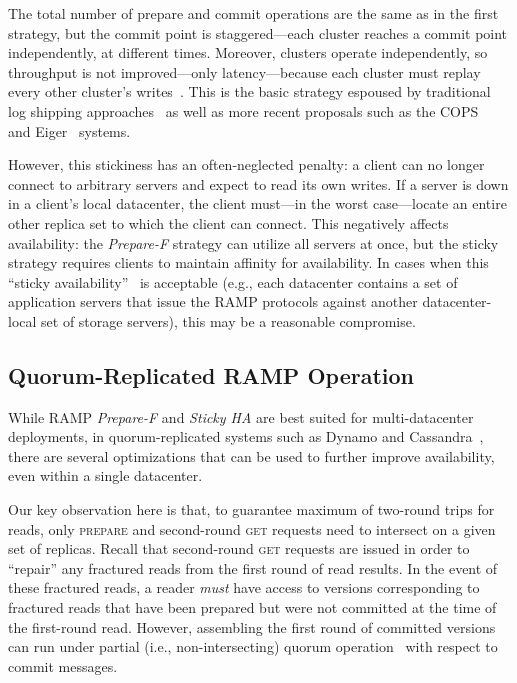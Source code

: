 The total number of prepare and commit operations are the same as in the first strategy, but the commit point is staggered---each cluster reaches a commit point independently, at different times. Moreover, clusters operate independently, so throughput is not improved---only latency---because each cluster must replay every other cluster's writes~\cite{explicit-socc}. This is the basic strategy espoused by traditional log shipping approaches~\cite{lazyreplication} as well as more recent proposals such as the COPS~\cite{cops} and Eiger~\cite{eiger} systems.

However, this stickiness has an often-neglected penalty: a client can no longer connect to arbitrary servers and expect to read its own writes. If a server is down in a client's local datacenter, the client must---in the worst case---locate an entire other replica set to which the client can connect. This negatively affects availability: the \textit{Prepare-F} strategy can utilize all servers at once, but the sticky strategy requires clients to maintain affinity for availability. In cases when this ``sticky availability''~\cite{hat-vldb} is acceptable (e.g., each datacenter contains a set of application servers that issue the RAMP protocols against another datacenter-local set of storage servers), this may be a reasonable compromise.

\subsection{Quorum-Replicated RAMP Operation}
\label{sec:quorum}

 While RAMP \textit{Prepare-F} and \textit{Sticky HA} are best suited for multi-datacenter deployments, in quorum-replicated systems such as Dynamo and Cassandra~\cite{cassandra-sigmod,dynamo}, there are several optimizations that can be used to further improve availability, even within a single datacenter.

Our key observation here is that, to guarantee maximum of two-round trips for reads, only \textsc{prepare} and second-round \textsc{get} requests need to intersect on a given set of replicas. Recall that second-round \textsc{get} requests are issued in order to ``repair'' any fractured reads from the first round of read results. In the event of these fractured reads, a reader \textit{must} have access to versions corresponding to fractured reads that have been prepared but were not committed at the time of the first-round read. However, assembling the first round of committed versions can run under partial (i.e., non-intersecting) quorum operation~\cite{prob-quorum} with respect to commit messages.

